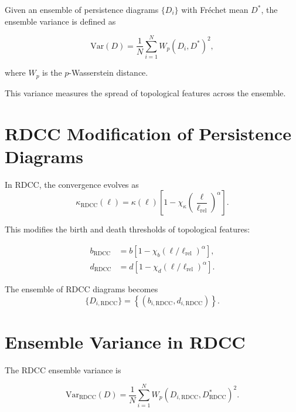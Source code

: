 \documentclass[11pt,a4paper]{article}
\begin{document}
Given an ensemble of persistence diagrams $\{D_{i}\}$ with Fréchet mean $D^{*}$, 
the ensemble variance is defined as

\begin{equation}
    \mathrm{Var}(D)
    = \frac{1}{N}
      \sum_{i=1}^{N}
      W_{p}(D_{i}, D^{*})^{2},
\end{equation}

where $W_{p}$ is the $p$-Wasserstein distance.

This variance measures the spread of topological features across the ensemble.
\section{RDCC Modification of Persistence Diagrams}

In RDCC, the convergence evolves as
\begin{equation}
    \kappa_{\mathrm{RDCC}}(\ell)
    = \kappa(\ell)
      \left[
        1 - \chi_{\kappa}
        \left(\frac{\ell}{\ell_{\mathrm{rel}}}\right)^{\alpha}
      \right].
\end{equation}

This modifies the birth and death thresholds of topological features:

\begin{align}
    b_{\mathrm{RDCC}} &= b \left[ 1 - \chi_{b} (\ell/\ell_{\mathrm{rel}})^{\alpha} \right], \\
    d_{\mathrm{RDCC}} &= d \left[ 1 - \chi_{d} (\ell/\ell_{\mathrm{rel}})^{\alpha} \right].
\end{align}

The ensemble of RDCC diagrams becomes
\begin{equation}
    \{ D_{i,\mathrm{RDCC}} \}
    = \left\{
        (b_{i,\mathrm{RDCC}}, d_{i,\mathrm{RDCC}})
      \right\}.
\end{equation}
\section{Ensemble Variance in RDCC}

The RDCC ensemble variance is

\begin{equation}
    \mathrm{Var}_{\mathrm{RDCC}}(D)
    = \frac{1}{N}
      \sum_{i=1}^{N}
      W_{p}(D_{i,\mathrm{RDCC}}, D^{*}_{\mathrm{RDCC}})^{2}.
\end{equation}
\end{document}

